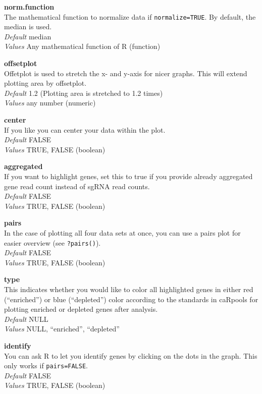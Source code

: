 \documentclass[]{article}
\begin{document}
\textbf{norm.function}\\
The mathematical function to normalize data if \texttt{normalize=TRUE}.
By default, the median is used.\\
\emph{Default} median\\
\emph{Values} Any mathematical function of R (function)

\textbf{offsetplot}\\
Offetplot is used to stretch the x- and y-axis for nicer graphs. This
will extend plotting area by offsetplot.\\
\emph{Default} 1.2 (Plotting area is stretched to 1.2 times)\\
\emph{Values} any number (numeric)

\textbf{center}\\
If you like you can center your data within the plot.\\
\emph{Default} FALSE\\
\emph{Values} TRUE, FALSE (boolean)

\textbf{aggregated}\\
If you want to highlight genes, set this to true if you provide already
aggregated gene read count instead of sgRNA read counts.\\
\emph{Default} FALSE\\
\emph{Values} TRUE, FALSE (boolean)

\textbf{pairs}\\
In the case of plotting all four data sets at once, you can use a pairs
plot for easier overview (see \texttt{?pairs()}).\\
\emph{Default} FALSE\\
\emph{Values} TRUE, FALSE (boolean)

\textbf{type}\\
This indicates whether you would like to color all highlighted genes in
either red (``enriched'') or blue (``depleted'') color according to the
standards in caRpools for plotting enriched or depleted genes after
analysis.\\
\emph{Default} NULL\\
\emph{Values} NULL, ``enriched'', ``depleted''

\textbf{identify}\\
You can ask R to let you identify genes by clicking on the dots in the
graph. This only works if \texttt{pairs=FALSE}.\\
\emph{Default} FALSE\\
\emph{Values} TRUE, FALSE (boolean)
\end{document}
